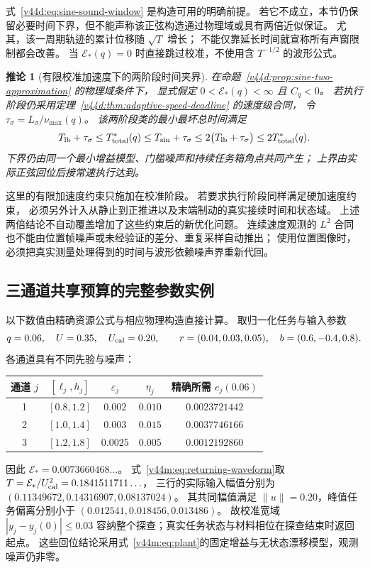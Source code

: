 \documentclass[11pt,a4paper]{article}
\numberwithin{equation}{section}
\newtheorem{corollary}[theorem]{推论}
\theoremstyle{definition}
\begin{document}
式~\eqref{v44d:eq:sine-sound-window} 是构造可用的明确前提。
若它不成立，本节仍保留必要时间下界，但不能声称该正弦构造通过物理域或具有两倍近似保证。
尤其，该一周期轨迹的累计位移随 $\sqrt T$ 增长；
不能仅靠延长时间就宣称所有声窗限制都会改善。
当 $\mathcal E_*(q)=0$ 时直接跳过校准，不使用含 $T^{-1/2}$ 的波形公式。

\begin{corollary}[有限校准加速度下的两阶段时间夹界]
\label{v44d:cor:smooth-two-stage-bound}
在命题~\ref{v44d:prop:sine-two-approximation} 的物理域条件下，
显式假定 $0<\mathcal E_*(q)<\infty$ 且 $C_q<0$。
若执行阶段仍采用定理~\ref{v44d:thm:adaptive-speed-deadline} 的速度级合同，
令 $\tau_\sigma=L_\sigma/\nu_{\max}(q)$。
该两阶段类的最小最坏总时间满足
\begin{equation}
 T_{\rm lb}+\tau_\sigma
 \le T_{\rm total}^*(q)
 \le T_{\sin}+\tau_\sigma
 \le2\bigl(T_{\rm lb}+\tau_\sigma\bigr)
 \le2T_{\rm total}^*(q).
 \label{v44d:eq:smooth-total-time-bracket}
\end{equation}
下界仍由同一个最小增益模型、门槛噪声和持续任务箱角点共同产生；
上界由实际正弦回位后接常速执行达到。
\end{corollary}

这里的有限加速度约束只施加在校准阶段。
若要求执行阶段同样满足硬加速度约束，
必须另外计入从静止到正推进以及末端制动的真实接续时间和状态域。
上述两倍结论不自动覆盖增加了这些约束后的新优化问题。
连续速度观测的 $L^2$ 合同也不能由位置帧噪声或未经验证的差分、重复采样自动推出；
使用位置图像时，必须把真实测量处理得到的时间与波形依赖噪声界重新代回。


\subsection{三通道共享预算的完整参数实例}
\label{v44m:sec:numeric-example}
以下数值由精确资源公式与相应物理构造直接计算。
取归一化任务与输入参数
\begin{equation}
 q=0.06,\quad U=0.35,\quad U_{\rm cal}=0.20,
 \qquad r=(0.04,0.03,0.05),\quad b=(0.6,-0.4,0.8).
\end{equation}
各通道具有不同先验与噪声：
\begin{center}\small
\begin{tabular}{ccccc}
\toprule
通道 $j$ & $[\ell_j,h_j]$ & $\varepsilon_j$ & $\eta_j$ & 精确所需 $e_j(0.06)$\\
\midrule
1 & $[0.8,1.2]$ & $0.002$ & $0.010$ & $0.0023721442$\\
2 & $[1.0,1.4]$ & $0.003$ & $0.015$ & $0.0037746166$\\
3 & $[1.2,1.8]$ & $0.0025$ & $0.005$ & $0.0012192860$\\
\bottomrule
\end{tabular}
\end{center}
因此 $\mathcal E_*=0.0073660468\ldots$。
式~\eqref{v44m:eq:returning-waveform}取
$T=\mathcal E_*/U_{\rm cal}^2=0.1841511711\ldots$，
三行的实际输入幅值分别为
$(0.11349672,0.14316907,0.08137024)$。
其共同幅值满足 $\|u\|=0.20$，峰值任务偏离分别小于
$(0.012541,0.018456,0.013486)$。
故校准宽域 $|y_j-y_j(0)|\le0.03$ 容纳整个探查；真实任务状态与材料相位在探查结束时返回起点。
这些回位结论采用式~\eqref{v44m:eq:plant}的固定增益与无状态漂移模型，观测噪声仍非零。
\end{document}
